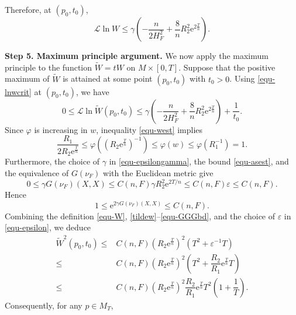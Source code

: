 \documentclass[11pt,reqno]{amsart}
\theoremstyle{definition}
\theoremstyle{remark}
\numberwithin{equation}{section}
\begin{document}
        Therefore, at $(p_0,t_0)$,
		\begin{equation}
			\mathscr{L}\ln W \leq \gamma\left( -\dfrac{n}{2H_F^2} + \dfrac{8}{n}R_2^2\mathrm{e}^{2\frac{T}{n}} \right). \label{equ-lnwcrit}
		\end{equation}
		
		\textbf{Step 5. Maximum principle argument.}
		We now apply the maximum principle to the function $\tilde{W}=tW$ on $M\times[0,T]$. Suppose that the positive maximum of $\tilde{W}$ is attained at some point $(p_0,t_0)$ with $t_0>0$. Using \eqref{equ-lnwcrit} at $(p_0,t_0)$, we have
		\begin{equation}
			0 \leq \mathscr{L}\ln \tilde{W}(p_0,t_0) \leq  \gamma\left( -\dfrac{n}{2H_F^2} + \dfrac{8}{n}R_2^2\mathrm{e}^{2\frac{T}{n}} \right) + \dfrac{1}{t_0}.
			\label{tildew}
		\end{equation}
		Since $\varphi$ is increasing in $w$, inequality \eqref{equ-west} implies
		\begin{equation*}
			\dfrac{R_1}{2R_2\mathrm{e}^{\frac{T}{n}}} \leq \varphi\left( \left(R_2\mathrm{e}^{\frac{T}{n}}\right)^{-1} \right) \leq\varphi(w) \leq \varphi(R_1^{-1}) = 1.
		\end{equation*}
		Furthermore, the choice of $\gamma$ in \eqref{equ-epsilongamma}, the bound \eqref{equ-asest}, and the equivalence of $G(\nu_F)$ with the Euclidean metric give
		\begin{equation*}
			0\leq \gamma G(\nu_F)(X,X)
			\leq C(n,F)\gamma R_2^2\mathrm{e}^{2T/n}
			\leq C(n,F)\varepsilon
			\leq C(n,F).
		\end{equation*}
		Hence
		\begin{equation}
			1\leq \mathrm{e}^{2\gamma G(\nu_F)(X,X)}\leq C(n,F).
			\label{equ-GGGbd}
		\end{equation}
		Combining the definition \eqref{equ-W}, \eqref{tildew}--\eqref{equ-GGGbd}, and the choice of $\varepsilon$ in \eqref{equ-epsilon}, we deduce
		\begin{align*}
			\tilde{W}^2(p_0,t_0)\leq & C(n,F)\left(R_2\mathrm{e}^{\frac{T}{n}}\right)^2\left( T^2 + \varepsilon^{-1}T \right) \nonumber\\
			\leq & C(n,F)\left(R_2\mathrm{e}^{\frac{T}{n}}\right)^2\left( T^2 + \dfrac{R_2}{R_1}\mathrm{e}^{\frac{T}{n}}T \right)\nonumber\\
			\leq & C(n,F) \left(R_2 \mathrm{e}^{\frac{T}{n}}\right)^2\dfrac{R_2}{R_1}\mathrm{e}^{\frac{T}{n}}T^2\left( 1 + \dfrac{1}{T} \right). \nonumber
		\end{align*}
		Consequently, for any $p\in M_T$,
\end{document}
